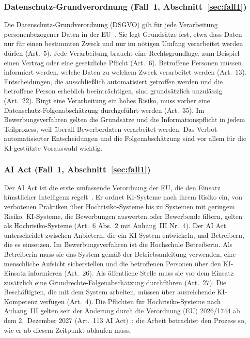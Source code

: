 \subsubsection[Datenschutz-Grundverordnung]{Datenschutz-Grundverordnung (Fall~1, Abschnitt~\ref{sec:fall1})}
Die Datenschutz-Grundverordnung (DSGVO) gilt für jede Verarbeitung personenbezogener Daten in der EU~\cite{dsgvo}.
Sie legt Grundsätze fest, etwa dass Daten nur für einen bestimmten Zweck und nur im nötigen Umfang verarbeitet werden dürfen (Art.~5).
Jede Verarbeitung braucht eine Rechtsgrundlage, zum Beispiel einen Vertrag oder eine gesetzliche Pflicht (Art.~6).
Betroffene Personen müssen informiert werden, welche Daten zu welchem Zweck verarbeitet werden (Art.~13).
Entscheidungen, die ausschließlich automatisiert getroffen werden und die betroffene Person erheblich beeinträchtigen, sind grundsätzlich unzulässig (Art.~22).
Birgt eine Verarbeitung ein hohes Risiko, muss vorher eine Datenschutz-Folgenabschätzung durchgeführt werden (Art.~35).
Im Bewerbungsverfahren gelten die Grundsätze und die Informationspflicht in jedem Teilprozess, weil überall Bewerberdaten verarbeitet werden.
Das Verbot automatisierter Entscheidungen und die Folgenabschätzung sind vor allem für die KI-gestützte Vorauswahl wichtig.

\subsubsection[AI Act]{AI Act (Fall~1, Abschnitt~\ref{sec:fall1})}
Der AI Act ist die erste umfassende Verordnung der EU, die den Einsatz künstlicher Intelligenz regelt~\cite{aiact2024}.
Er ordnet KI-Systeme nach ihrem Risiko ein, von verbotenen Praktiken über Hochrisiko-Systeme bis zu Systemen mit geringem Risiko.
KI-Systeme, die Bewerbungen auswerten oder Bewerbende filtern, gelten als Hochrisiko-Systeme (Art.~6 Abs.~2 mit Anhang~III Nr.~4).
Der AI Act unterscheidet zwischen Anbietern, die ein KI-System entwickeln, und Betreibern, die es einsetzen.
Im Bewerbungsverfahren ist die Hochschule Betreiberin.
Als Betreiberin muss sie das System gemäß der Betriebsanleitung verwenden, eine menschliche Aufsicht sicherstellen und die betroffenen Personen über den KI-Einsatz informieren (Art.~26).
Als öffentliche Stelle muss sie vor dem Einsatz zusätzlich eine Grundrechte-Folgenabschätzung durchführen (Art.~27).
Die Beschäftigten, die mit dem System arbeiten, müssen über ausreichende KI-Kompetenz verfügen (Art.~4).
Die Pflichten für Hochrisiko-Systeme nach Anhang~III gelten seit der Änderung durch die Verordnung (EU) 2026/1744 ab dem 2.~Dezember 2027 (Art.~113 AI Act)~\cite{aiact2024,omnibus2026}; die Arbeit betrachtet den Prozess so, wie er ab diesem Zeitpunkt ablaufen muss.

